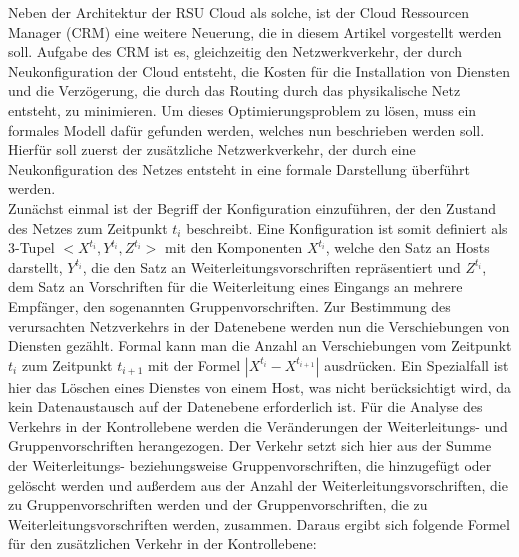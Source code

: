 \documentclass[conference]{IEEEtran}
\begin{document}
Neben der Architektur der RSU Cloud als solche, ist der Cloud Ressourcen Manager (CRM) eine weitere
Neuerung, die in diesem Artikel vorgestellt werden soll.  Aufgabe des CRM ist es, gleichzeitig den Netzwerkverkehr, der durch Neukonfiguration der Cloud entsteht, die Kosten für die Installation von Diensten und die Verzögerung, die durch das Routing durch das physikalische Netz entsteht, zu minimieren.
Um dieses Optimierungsproblem zu lösen, muss ein formales Modell dafür gefunden werden, welches nun beschrieben werden soll. Hierfür soll zuerst der zusätzliche Netzwerkverkehr, der durch eine Neukonfiguration des Netzes entsteht in eine formale Darstellung überführt werden.
\\
Zunächst einmal ist der Begriff der Konfiguration einzuführen, der den Zustand des Netzes zum Zeitpunkt \(t_i\) beschreibt. Eine Konfiguration ist somit definiert als 3-Tupel \(<X^{t_i},Y^{t_i},Z^{t_i}>\) mit den Komponenten $X^{t_i}$, welche den Satz an Hosts darstellt, \(Y^{t_i}\), die den Satz an Weiterleitungsvorschriften repräsentiert und \(Z^{t_i}\),  dem Satz an Vorschriften für die Weiterleitung eines Eingangs an mehrere Empfänger, den sogenannten Gruppenvorschriften. Zur Bestimmung des verursachten Netzverkehrs in der Datenebene werden nun die Verschiebungen von Diensten gezählt. Formal kann man die Anzahl an Verschiebungen vom Zeitpunkt \(t_i\) zum Zeitpunkt \(t_{i+1}\) mit der Formel \(|X^{t_i}-X^{t_{i+1}}|\) ausdrücken. Ein Spezialfall ist hier das Löschen eines Dienstes von einem Host, was nicht berücksichtigt wird, da kein Datenaustausch auf der Datenebene erforderlich ist. Für die Analyse des Verkehrs in der Kontrollebene werden die Veränderungen der Weiterleitungs- und Gruppenvorschriften herangezogen. Der Verkehr setzt sich hier aus der Summe der Weiterleitungs- beziehungsweise Gruppenvorschriften, die hinzugefügt oder gelöscht werden und außerdem aus der Anzahl der Weiterleitungsvorschriften, die zu Gruppenvorschriften werden und der Gruppenvorschriften, die zu Weiterleitungsvorschriften werden, zusammen. Daraus ergibt sich folgende Formel für den zusätzlichen Verkehr in der Kontrollebene: 
\end{document}
